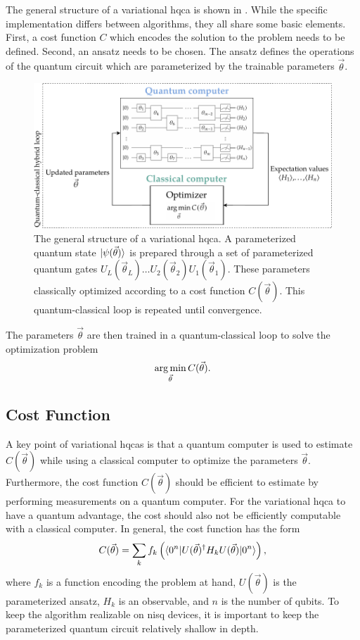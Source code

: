 The general structure of a variational \gls{hqca} is shown in .
While the specific implementation differs between algorithms, they all share some basic elements.
First, a cost function $C$ which encodes the solution to the problem needs to be defined.
Second, an ansatz needs to be chosen.
The ansatz defines the operations of the quantum circuit which are parameterized by the trainable parameters $\vec{\theta}$.
\begin{figure}[ht]
    \centering
    \includegraphics[width=1\linewidth]{figures/vqa-general-structure.pdf}
    \caption[The general structure of a variational \acrshort{hqca}.]{The general structure of a variational \gls{hqca}. A parameterized quantum state $\vert{\psi(\vec{\theta})}\rangle$ is prepared through a set of parameterized quantum gates $U_L(\vec{\theta}_L) \ldots U_2(\vec{\theta}_2)U_1(\vec{\theta}_1)$. These parameters classically optimized according to a cost function $C(\vec{\theta})$. This quantum-classical loop is repeated until convergence.}
    \label{fig:vqa-general-structure}
\end{figure}
The parameters $\vec{\theta}$ are then trained in a quantum-classical loop to solve the optimization problem
\begin{equation}
\operatorname*{arg\,min}_{\vec{\theta}} C(\vec{\theta}).
\end{equation}

\subsection{Cost Function}
A key point of variational \glspl{hqca} is that a quantum computer is used to estimate $C(\vec{\theta})$ while using a classical computer to optimize the parameters $\vec{\theta}$.
Furthermore, the cost function $C(\vec{\theta})$ should be efficient to estimate by performing measurements on a quantum computer.
For the variational \gls{hqca} to have a quantum advantage, the cost should also not be efficiently computable with a classical computer.
In general, the cost function has the form
\begin{equation}
C(\vec{\theta}) = \sum_k f_k\left(\langle{0^n}\vert U(\vec{\theta})^\dagger H_k U(\vec{\theta})\vert{0^n}\rangle\right),
\end{equation}
where $f_k$ is a function encoding the problem at hand, $U(\vec{\theta})$ is the parameterized ansatz, $H_k$ is an observable, and $n$ is the number of qubits.
To keep the algorithm realizable on \gls{nisq} devices, it is important to keep the parameterized quantum circuit relatively shallow in depth.

